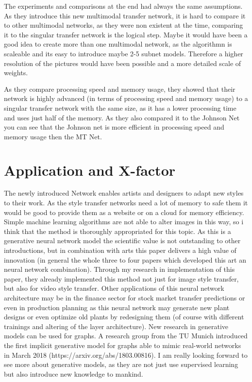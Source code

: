 \documentclass[11pt]{article}
\begin{document}
The experiments and comparisons at the end had always the same
assumptions. As they introduce this new multimodal transfer network, it
is hard to compare it to other multimodal networks, as they were non
existent at the time, comparing it to the singular transfer network is
the logical step. Maybe it would have been a good idea to create more
than one multimodal network, as the algorithmn is scaleable and its easy
to introduce maybe 2-5 subnet models. Therefore a higher resolution of
the pictures would have been possible and a more detailed scale of
weights.

As they compare processing speed and memory usage, they showed that
their network is highly advanced (in terms of processing speed and
memory usage) to a singular transfer network with the same size, as it
has a lower processing time and uses just half of the memory. As they
also compared it to the Johnson Net you can see that the Johnson net is
more efficient in processing speed and memory usage then the MT Net.

    \section{Application and X-factor}\label{application-and-x-factor}

The newly introduced Network enables artists and designers to adapt new
styles to their work. As the style transfer networks need a lot of
memory to safe them it would be good to provide them as a website or on
a cloud for memory efficiency. Simple machine learning algorithms are
not able to alter images in this way, so i think that the method is
thoroughly appropriated for this topic. As this is a generative neural
network model the scientific value is not outstanding to other
introductions, but in combination with arts this paper delivers a high
value of innovation (in general the whole three to four papers which
developed this art an neural network combination). Through my research
in implementation of this paper, they already implemented this method
not just for image style transfer, but also for video style transfer.
Other applications of this neural network architecture may be in the
finance sector for stock market transfer predictions or even in
production planning as this neural network may generate new plant
designs or even optimize old plants by redesigning them (of course with
different trainings and altering of the layer architecture). New
research in generative models can be used for graphs. A research group
from the TU Munich introduced the first implicit generative model for
graphs able to mimic real-world networks in March 2018
(https://arxiv.org/abs/1803.00816). I am really looking forward to see
more about generative models, as they are not just use supervised
learning but also introduce new knowledge to mankind.
\end{document}
